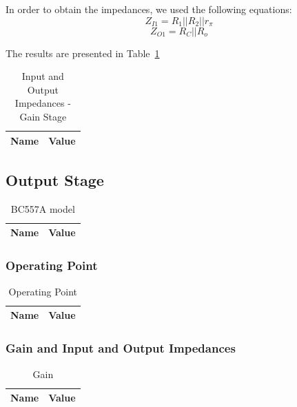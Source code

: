 In order to obtain the impedances, we used the following equations:
\begin{equation}
	Z_{I1}=R_1||R_2||r_\pi
\end{equation}
\begin{equation}
	Z_{O1}=R_C||R_o
\end{equation}

The results are presented in Table~\ref{tab:zgs}
\begin{table}[H]
  \centering
  \begin{tabular}{|l|r|}
     \hline    
    {\bf Name} & {\bf Value} \\ \hline   
    
  \end{tabular}
  \caption{Input and Output Impedances - Gain Stage}
  \label{tab:zgs}
\end{table}
\subsection{Output Stage}

\begin{table}[H]
  \centering
  \begin{tabular}{|l|r|}
     \hline    
    {\bf Name} & {\bf Value} \\ \hline   
    
  \end{tabular}
  \caption{BC557A model}
  \label{tab:modelos}
\end{table}

\subsubsection{Operating Point}

\begin{table}[H]
  \centering
  \begin{tabular}{|l|r|}
     \hline    
    {\bf Name} & {\bf Value} \\ \hline   
    
  \end{tabular}
  \caption{Operating Point}
  \label{tab:osop}
\end{table}

\subsubsection{Gain and Input and Output Impedances}

\begin{table}[H]
  \centering
  \begin{tabular}{|l|r|}
     \hline    
    {\bf Name} & {\bf Value} \\ \hline   
    
  \end{tabular}
  \caption{Gain}
  \label{tab:osav}
\end{table}


